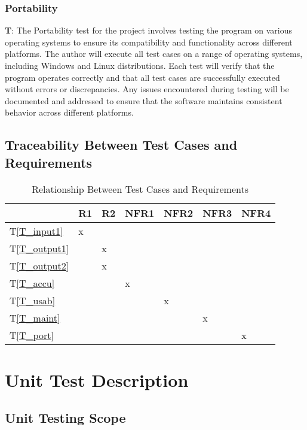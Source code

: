 \documentclass[12pt, titlepage]{article}
\newcounter{testCase}
\newcommand{\testCaseFormat}{T\thetestCase}
\newcommand{\tref}[1]{T\ref{#1}}
\begin{document}
\subsubsection{Portability}\label{subsec:Portability}
 \textbf{\testCaseFormat \label{T_port}}: The Portability test for the project involves testing the program on various operating systems to ensure its compatibility and functionality across different platforms. The author will execute all test cases on a range of operating systems, including Windows and Linux distributions. Each test will verify that the program operates correctly and that all test cases are successfully executed without errors or discrepancies. Any issues encountered during testing will be documented and addressed to ensure that the software maintains consistent behavior across different platforms. 

\subsection{Traceability Between Test Cases and Requirements}

\begin{table}[H]
\centering
\begin{tabular}{|l|l|l|l|l|l|l|}
\hline
& R1 & R2 & NFR1 & NFR2 & NFR3 & NFR4 \\ \hline
\tref{T_input1} & x & & & & & \\ \hline
\tref{T_output1} & & x & & & & \\ \hline
\tref{T_output2} & & x & & & & \\ \hline
\tref{T_accu} & & &x & & & \\ \hline
\tref{T_usab} & & & &x & & \\ \hline
\tref{T_maint} & & & & &x & \\ \hline
\tref{T_port} & & & & & &x \\ \hline
\end{tabular}
\caption{Relationship Between Test Cases and Requirements}
\label{tab:traceability}
\end{table}

\section{Unit Test Description}


\subsection{Unit Testing Scope}
\end{document}
